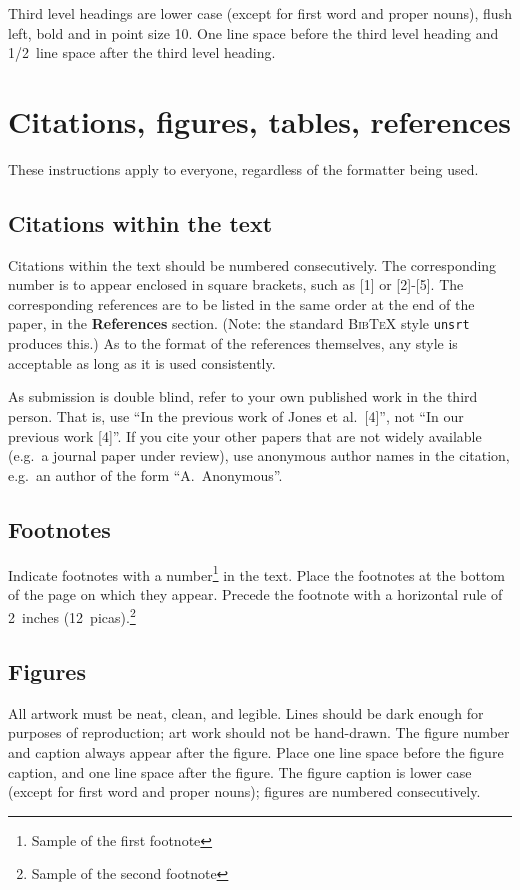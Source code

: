 \documentclass{article} %
\begin{document}
Third level headings are lower case (except for first word and proper nouns),
flush left, bold and in point size 10. One line space before the third level
heading and 1/2~line space after the third level heading.

\section{Citations, figures, tables, references}
\label{others}

These instructions apply to everyone, regardless of the formatter being used.

\subsection{Citations within the text}

Citations within the text should be numbered consecutively. The corresponding
number is to appear enclosed in square brackets, such as [1] or [2]-[5]. The
corresponding references are to be listed in the same order at the end of the
paper, in the \textbf{References} section. (Note: the standard
\textsc{Bib\TeX} style \texttt{unsrt} produces this.) As to the format of the
references themselves, any style is acceptable as long as it is used
consistently.

As submission is double blind, refer to your own published work in the 
third person. That is, use ``In the previous work of Jones et al.\ [4]'',
not ``In our previous work [4]''. If you cite your other papers that
are not widely available (e.g.\ a journal paper under review), use
anonymous author names in the citation, e.g.\ an author of the
form ``A.\ Anonymous''. 


\subsection{Footnotes}

Indicate footnotes with a number\footnote{Sample of the first footnote} in the
text. Place the footnotes at the bottom of the page on which they appear.
Precede the footnote with a horizontal rule of 2~inches
(12~picas).\footnote{Sample of the second footnote}

\subsection{Figures}

All artwork must be neat, clean, and legible. Lines should be dark
enough for purposes of reproduction; art work should not be
hand-drawn. The figure number and caption always appear after the
figure. Place one line space before the figure caption, and one line
space after the figure. The figure caption is lower case (except for
first word and proper nouns); figures are numbered consecutively.
\end{document}
